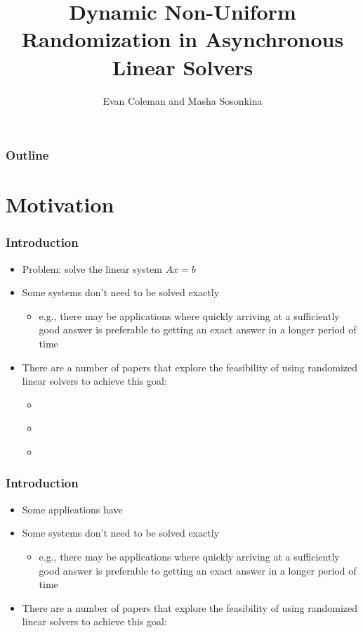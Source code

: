 \documentclass{beamer}
\title[Randomized Asynchronous Linear Solvers]{Dynamic Non-Uniform Randomization in Asynchronous Linear Solvers}
\author[Coleman \& Sosonkina]{Evan Coleman and Masha Sosonkina}
\date{}
\begin{document}
%
\begin{frame}
	\titlepage
\end{frame}


\begin{frame}
	\frametitle{Outline}
	\tableofcontents
\end{frame}

\section{Motivation}

\begin{frame}
	\frametitle{Introduction}
	\begin{itemize}
		\item Problem: solve the linear system $Ax = b$
		\item Some systems don't need to be solved exactly
		    \begin{itemize}
		        \item e.g., there may be applications where quickly arriving at a sufficiently good answer is preferable to getting an exact answer in a longer period of time
		    \end{itemize}
	    \item There are a number of papers that explore the feasibility of using randomized linear solvers to achieve this goal:
	        \begin{itemize}
	            \item \textcite{leventhal2010randomized}
	            \item \textcite{griebel2012greedy}
	            \item \textcite{avron2015revisiting}
	        \end{itemize}
	\end{itemize}	
\end{frame}

\begin{frame}
	\frametitle{Introduction}
	\begin{itemize}
		\item Some applications have 
		\item Some systems don't need to be solved exactly
		    \begin{itemize}
		        \item e.g., there may be applications where quickly arriving at a sufficiently good answer is preferable to getting an exact answer in a longer period of time
		    \end{itemize}
	    \item There are a number of papers that explore the feasibility of using randomized linear solvers to achieve this goal:
	\end{itemize}	
\end{frame}
\end{document}
